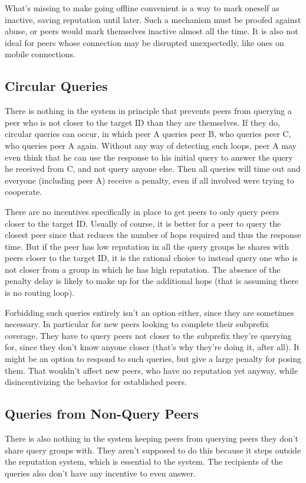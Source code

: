 What's missing to make going offline convenient is a way to mark oneself as
inactive, saving reputation until later. Such a mechanism must be proofed
against abuse, or peers would mark themselves inactive almost all the time. It
is also not ideal for peers whose connection may be disrupted unexpectedly, like
ones on mobile connections.

\subsection{Circular Queries}
There is nothing in the system in principle that prevents peers from querying a
peer who is not closer to the target ID than they are themselves. If they do,
circular queries can occur, in which peer A queries peer B, who queries peer C,
who queries peer A again. Without any way of detecting such loops, peer A may
even think that he can use the response to his initial query to answer the query
he received from C, and not query anyone else. Then all queries will time out
and everyone (including peer A) receive a penalty, even if all involved were
trying to cooperate.

There are no incentives specifically in place to get peers to only query peers
closer to the target ID. Usually of course, it is better for a peer to query the
closest peer since that reduces the number of hops required and thus the
response time. But if the peer has low reputation in all the query groups he
shares with peers closer to the target ID, it is the rational choice to instead
query one who is not closer from a group in which he has high reputation. The
absence of the penalty delay is likely to make up for the additional hops (that
is assuming there is no routing loop).

Forbidding such queries entirely isn't an option either, since they are
sometimes necessary. In particular for new peers looking to complete their
subprefix coverage. They have to query peers not closer to the subprefix they're
querying for, since they don't know anyone closer (that's why they're doing it,
after all). It might be an option to respond to such queries, but give a large
penalty for posing them. That wouldn't affect new peers, who have no reputation
yet anyway, while disincentivizing the behavior for established peers.

\subsection{Queries from Non-Query Peers}
There is also nothing in the system keeping peers from querying peers they don't
share query groups with. They aren't supposed to do this because it steps
outside the reputation system, which is essential to the system. The recipients
of the queries also don't have any incentive to even answer.

